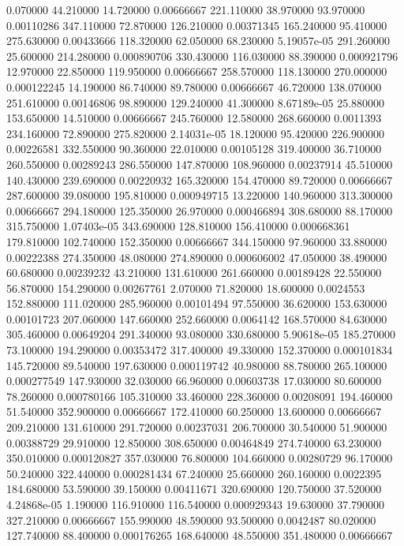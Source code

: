 0.070000	44.210000	14.720000	0.00666667
221.110000	38.970000	93.970000	0.00110286
347.110000	72.870000	126.210000	0.00371345
165.240000	95.410000	275.630000	0.00433666
118.320000	62.050000	68.230000	5.19057e-05
291.260000	25.600000	214.280000	0.000890706
330.430000	116.030000	88.390000	0.000921796
12.970000	22.850000	119.950000	0.00666667
258.570000	118.130000	270.000000	0.000122245
14.190000	86.740000	89.780000	0.00666667
46.720000	138.070000	251.610000	0.00146806
98.890000	129.240000	41.300000	8.67189e-05
25.880000	153.650000	14.510000	0.00666667
245.760000	12.580000	268.660000	0.0011393
234.160000	72.890000	275.820000	2.14031e-05
18.120000	95.420000	226.900000	0.00226581
332.550000	90.360000	22.010000	0.00105128
319.400000	36.710000	260.550000	0.00289243
286.550000	147.870000	108.960000	0.00237914
45.510000	140.430000	239.690000	0.00220932
165.320000	154.470000	89.720000	0.00666667
287.600000	39.080000	195.810000	0.000949715
13.220000	140.960000	313.300000	0.00666667
294.180000	125.350000	26.970000	0.000466894
308.680000	88.170000	315.750000	1.07403e-05
343.690000	128.810000	156.410000	0.000668361
179.810000	102.740000	152.350000	0.00666667
344.150000	97.960000	33.880000	0.00222388
274.350000	48.080000	274.890000	0.000606002
47.050000	38.490000	60.680000	0.00239232
43.210000	131.610000	261.660000	0.00189428
22.550000	56.870000	154.290000	0.00267761
2.070000	71.820000	18.600000	0.0024553
152.880000	111.020000	285.960000	0.00101494
97.550000	36.620000	153.630000	0.00101723
207.060000	147.660000	252.660000	0.0064142
168.570000	84.630000	305.460000	0.00649204
291.340000	93.080000	330.680000	5.90618e-05
185.270000	73.100000	194.290000	0.00353472
317.400000	49.330000	152.370000	0.000101834
145.720000	89.540000	197.630000	0.000119742
40.980000	88.780000	265.100000	0.000277549
147.930000	32.030000	66.960000	0.00603738
17.030000	80.600000	78.260000	0.000780166
105.310000	33.460000	228.360000	0.00208091
194.460000	51.540000	352.900000	0.00666667
172.410000	60.250000	13.600000	0.00666667
209.210000	131.610000	291.720000	0.00237031
206.700000	30.540000	51.900000	0.00388729
29.910000	12.850000	308.650000	0.00464849
274.740000	63.230000	350.010000	0.000120827
357.030000	76.800000	104.660000	0.00280729
96.170000	50.240000	322.440000	0.000281434
67.240000	25.660000	260.160000	0.0022395
184.680000	53.590000	39.150000	0.00411671
320.690000	120.750000	37.520000	4.24868e-05
1.190000	116.910000	116.540000	0.000929343
19.630000	37.790000	327.210000	0.00666667
155.990000	48.590000	93.500000	0.0042487
80.020000	127.740000	88.400000	0.000176265
168.640000	48.550000	351.480000	0.00666667
